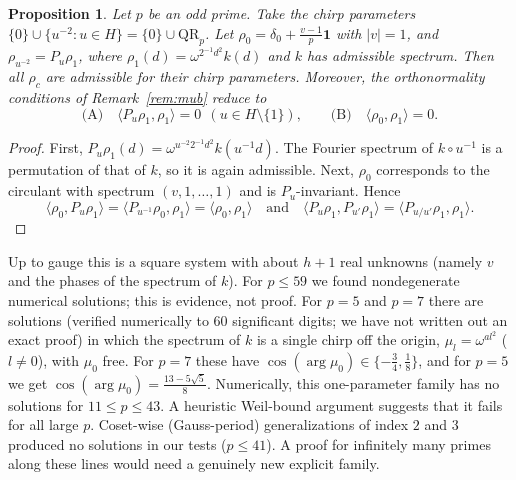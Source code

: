 \documentclass[11pt]{amsart}
\newtheorem{proposition}[theorem]{Proposition}
\theoremstyle{definition}
\theoremstyle{remark}
\newcommand{\ip}[2]{\langle #1,#2\rangle}
\begin{document}
\begin{proposition}\label{prop:prime}
Let $p$ be an odd prime. Take the chirp parameters $\{0\}\cup\{u^{-2}:u\in H\}=\{0\}\cup\mathrm{QR}_p$. Let $\rho_0=\delta_0+\frac{v-1}{p}\mathbf 1$ with $|v|=1$, and $\rho_{u^{-2}}=P_u\rho_1$, where $\rho_1(d)=\omega^{2^{-1}d^2}k(d)$ and $k$ has admissible spectrum. Then all $\rho_c$ are admissible for their chirp parameters. Moreover, the orthonormality conditions of Remark~\ref{rem:mub} reduce to
\[
\text{(A)}\quad \ip{P_u\rho_1}{\rho_1}=0\ \ (u\in H\setminus\{1\}),\qquad\text{(B)}\quad\ip{\rho_0}{\rho_1}=0 .
\]
\end{proposition}

\begin{proof}
First, $P_u\rho_1(d)=\omega^{u^{-2}2^{-1}d^2}k(u^{-1}d)$. The Fourier spectrum of $k\circ u^{-1}$ is a permutation of that of $k$, so it is again admissible. Next, $\rho_0$ corresponds to the circulant with spectrum $(v,1,\dots,1)$ and is $P_u$-invariant. Hence
\[
\ip{\rho_0}{P_u\rho_1}=\ip{P_{u^{-1}}\rho_0}{\rho_1}=\ip{\rho_0}{\rho_1}
\quad\text{and}\quad
\ip{P_u\rho_1}{P_{u'}\rho_1}=\ip{P_{u/u'}\rho_1}{\rho_1}.
\]
\end{proof}

Up to gauge this is a square system with about $h+1$ real unknowns (namely $v$ and the phases of the spectrum of $k$). For $p\le 59$ we found nondegenerate numerical solutions; this is evidence, not proof. For $p=5$ and $p=7$ there are solutions (verified numerically to $60$ significant digits; we have not written out an exact proof) in which the spectrum of $k$ is a single chirp off the origin, $\mu_l=\omega^{al^2}$ ($l\ne0$), with $\mu_0$ free. For $p=7$ these have $\cos(\arg\mu_0)\in\{-\tfrac34,\tfrac18\}$, and for $p=5$ we get $\cos(\arg\mu_0)=\tfrac{13-5\sqrt5}{8}$.
Numerically, this one-parameter family has no solutions for $11\le p\le 43$. A heuristic Weil-bound argument suggests that it fails for all large $p$. Coset-wise (Gauss-period) generalizations of index $2$ and $3$ produced no solutions in our tests ($p\le41$). A proof for infinitely many primes along these lines would need a genuinely new explicit family.
\end{document}
